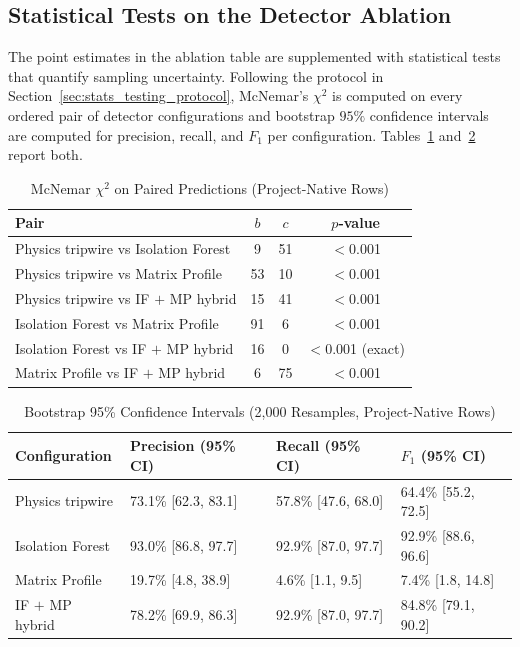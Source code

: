\subsection{Statistical Tests on the Detector Ablation}
\label{sec:so4_stats_tests}

The point estimates in the ablation table are supplemented with statistical tests that quantify sampling uncertainty. Following the protocol in Section~\ref{sec:stats_testing_protocol}, McNemar's $\chi^{2}$ is computed on every ordered pair of detector configurations and bootstrap $95\%$ confidence intervals are computed for precision, recall, and $F_1$ per configuration. Tables~\ref{tab:so4_stats_tests} and~\ref{tab:so4_bootstrap_cis} report both.

\begin{table}[!htbp]
\centering
\caption{McNemar $\chi^{2}$ on Paired Predictions (Project-Native Rows)}
\label{tab:so4_stats_tests}
\small
\setlength{\tabcolsep}{4pt}
\begin{tabular}{|p{}|c|c|c|}
\hline
\textbf{Pair} & \textbf{$b$} & \textbf{$c$} & \textbf{$p$-value} \\
\hline
Physics tripwire vs Isolation Forest & 9 & 51 & $<$0.001 \\
\hline
Physics tripwire vs Matrix Profile & 53 & 10 & $<$0.001 \\
\hline
Physics tripwire vs IF $+$ MP hybrid & 15 & 41 & $<$0.001 \\
\hline
Isolation Forest vs Matrix Profile & 91 & 6 & $<$0.001 \\
\hline
Isolation Forest vs IF $+$ MP hybrid & 16 & 0 & $<$0.001 (exact) \\
\hline
Matrix Profile vs IF $+$ MP hybrid & 6 & 75 & $<$0.001 \\
\hline
\end{tabular}
\end{table}

\begin{table}[!htbp]
\centering
\caption{Bootstrap 95\% Confidence Intervals (2{,}000 Resamples, Project-Native Rows)}
\label{tab:so4_bootstrap_cis}
\small
\setlength{\tabcolsep}{3pt}
\begin{tabular}{|p{}|p{}|p{}|p{}|}
\hline
\textbf{Configuration} & \textbf{Precision (95\% CI)} & \textbf{Recall (95\% CI)} & \textbf{$F_1$ (95\% CI)} \\
\hline
Physics tripwire     & 73.1\% [62.3, 83.1] & 57.8\% [47.6, 68.0] & 64.4\% [55.2, 72.5] \\
\hline
Isolation Forest     & 93.0\% [86.8, 97.7] & 92.9\% [87.0, 97.7] & 92.9\% [88.6, 96.6] \\
\hline
Matrix Profile       & 19.7\% [4.8, 38.9]  &  4.6\% [1.1, 9.5]   &  7.4\% [1.8, 14.8] \\
\hline
IF $+$ MP hybrid     & 78.2\% [69.9, 86.3] & 92.9\% [87.0, 97.7] & 84.8\% [79.1, 90.2] \\
\hline
\end{tabular}
\end{table}

